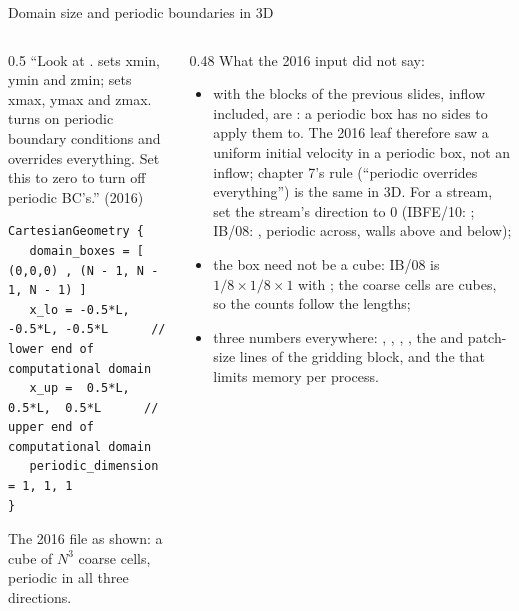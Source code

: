 \documentclass[aspectratio=169,11pt]{beamer}
\begin{document}
\begin{frame}[fragile]{Domain size and periodic boundaries in 3D}
\label{fr:domain}
\begin{columns}[T,onlytextwidth]
\begin{column}{0.5\textwidth}
\small ``Look at .  sets xmin, ymin and zmin;  sets xmax, ymax and zmax.  turns on periodic boundary conditions and overrides everything. Set this to zero to turn off periodic BC's.'' (2016)
\begin{lstlisting}[style=inputtiny]
CartesianGeometry {
   domain_boxes = [ (0,0,0) , (N - 1, N - 1, N - 1) ]
   x_lo = -0.5*L, -0.5*L, -0.5*L      // lower end of computational domain
   x_up =  0.5*L,  0.5*L,  0.5*L      // upper end of computational domain
   periodic_dimension = 1, 1, 1
}
\end{lstlisting}
\footnotesize The 2016 file as shown: a cube of $N^3$ coarse cells, periodic in all three directions.
\end{column}
\begin{column}{0.48\textwidth}
\scriptsize What the 2016 input did not say:
\begin{itemize}
  \item with  the  blocks of the previous slides, inflow included, are : a periodic box has no sides to apply them to. The 2016 leaf therefore saw a uniform initial velocity in a periodic box, not an inflow; chapter 7's rule (``periodic overrides everything'') is the same in 3D. For a stream, set the stream's direction to 0 (IBFE/10: ; IB/08: , periodic across, walls above and below);
  \item the box need not be a cube: IB/08 is $1/8\times1/8\times1$ with ; the coarse cells are cubes, so the counts follow the lengths;
  \item three numbers everywhere: , , , , the  and patch-size lines of the gridding block, and the  that limits memory per process.
\end{itemize}
\end{column}
\end{columns}
\end{frame}
\end{document}
